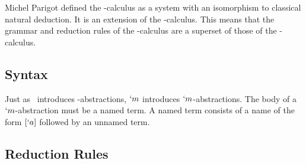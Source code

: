   Michel Parigot defined the \lmu-calculus as a system with an isomorphism to classical natural deduction.
  It is an extension of the \lam-calculus. 
  This means that the grammar and reduction rules of the \lmu-calculus are a superset of those of the \lam-calculus.
  

  \subsection{Syntax}
  
  Just as \lam\ introduces \lam-abstractions, 
  $`m$ introduces $`m$-abstractions. 
  The body of a $`m$-abstraction must be a named term. 
  A named term consists of a name of the form $[`a]$ followed by an unnamed 
  term. 

  \begin{figure}[H]
  \end{figure}
  
  \subsection{Reduction Rules}
  \begin{figure}[H]
  \end{figure}

